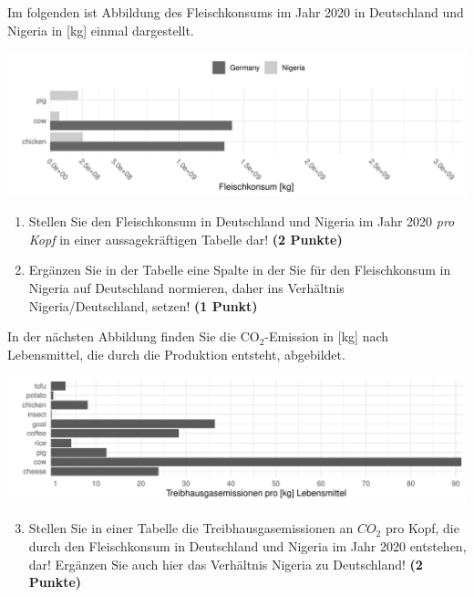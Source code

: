 \documentclass[a4paper, 9pt]{scrartcl}\usepackage[]{graphicx}\usepackage[]{xcolor}
\makeatletter
\def\maxwidth{ %
  \ifdim\Gin@nat@width>\linewidth
    \linewidth
  \else
    \Gin@nat@width
  \fi
}
\newenvironment{knitrout}{}{} %
\makeatother
\begin{document}
Im folgenden ist Abbildung des Fleischkonsums im Jahr 2020 in
Deutschland und Nigeria in [kg] einmal dargestellt. 

\begin{knitrout}
\color{fgcolor}

{\centering \includegraphics[width=\maxwidth]{img/math-14-a-1} 

}


\end{knitrout}
  
\begin{enumerate}
\item Stellen Sie den Fleischkonsum in Deutschland und Nigeria im Jahr
  2020 \textit{pro Kopf} in einer aussagekr{\"a}ftigen Tabelle dar! 
  \textbf{(2 Punkte)}
\item Erg{\"a}nzen Sie in der Tabelle eine Spalte in der Sie f{\"u}r den
  Fleischkonsum in Nigeria auf Deutschland normieren, daher ins Verh{\"a}ltnis
  Nigeria/Deutschland, setzen! \textbf{(1 Punkt)}
\end{enumerate}

In der n{\"a}chsten Abbildung finden Sie die CO$_2$-Emission in [kg] nach
Lebensmittel, die durch die Produktion entsteht, abgebildet.

\begin{knitrout}
\color{fgcolor}

{\centering \includegraphics[width=\maxwidth]{img/math-14-b-1} 

}


\end{knitrout}

\begin{enumerate}
  \setcounter{enumi}{2}  
\item Stellen Sie in einer Tabelle die Treibhausgasemissionen an $CO_2$ pro
  Kopf, die durch den Fleischkonsum in Deutschland und Nigeria im Jahr
  2020 entstehen, dar! Erg{\"a}nzen Sie auch hier das Verh{\"a}ltnis
  Nigeria zu Deutschland! \textbf{(2 Punkte)}
\end{enumerate}
\end{document}
